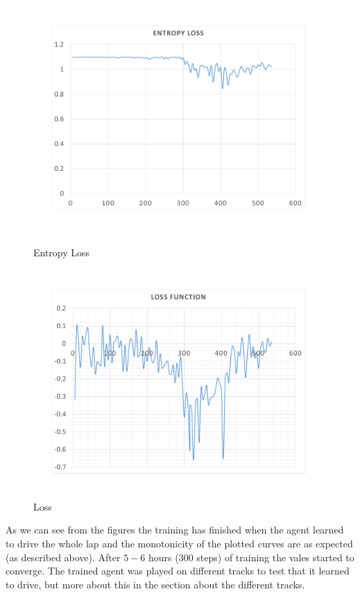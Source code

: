 \begin{figure}[H]
	\includegraphics[width=\linewidth]{Figures/EntropyLoss}
	\caption{Entropy Loss}\label{fig:EntropyLoss}
	\endminipage\hfill
	\includegraphics[width=\linewidth]{Figures/Loss}
	\caption{Loss}\label{fig:Loss}
	\endminipage
\end{figure}
As we can see from the figures the training has finished when the agent learned to drive the whole lap and the monotonicity of the plotted curves are as expected (as described above). After $5-6$ hours ($300$ steps) of training the vales started to converge. The trained agent was played on different tracks to test that it learned to drive, but more about this in the section about the different tracks.

